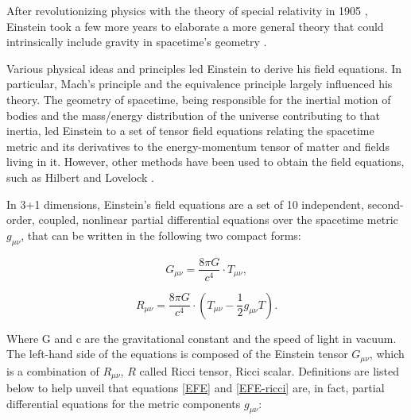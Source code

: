 After revolutionizing physics with the theory of special relativity in 1905 \cite{Einstein:1905}, Einstein took a few more years to elaborate a more general theory that could intrinsically include gravity in spacetime's geometry \cite{Einstein:1915ca}.

Various physical ideas and principles led Einstein to derive his field equations. In particular, Mach's principle \cite{mach1919science, 1995mpfn.conf.....B} and the equivalence principle largely influenced his theory. The geometry of spacetime, being responsible for the inertial motion of bodies and the mass/energy distribution of the universe contributing to that inertia, led Einstein to a set of tensor field equations relating the spacetime metric and its derivatives to the energy-momentum tensor of matter and fields living in it. However, other methods have been used to obtain the field equations, such as Hilbert \cite{Hilbert:1915tx} and Lovelock \cite{Lovelock:1971yv}. 

In 3+1 dimensions, Einstein's field equations are a set of 10 independent, second-order, coupled, nonlinear partial differential equations over the spacetime metric $g_{\mu \nu}$, that can be written in the following two compact forms:

\begin{equation}\label{EFE}
G_{\mu\nu}  =  \frac{8\pi G}{c^4} \cdot T_{\mu\nu},
\end{equation}

\begin{equation}\label{EFE-ricci}
R_{\mu\nu}  =  \frac{8\pi G}{c^4} \cdot (T_{\mu\nu} - \frac{1}{2} g_{\mu\nu} T).
\end{equation}

Where G and c are the gravitational constant and the speed of light in vacuum. The left-hand side of the equations is composed of the Einstein tensor $G_{\mu\nu}$, which is a combination of $R_{\mu\nu}$, $R$ called Ricci tensor, Ricci scalar. Definitions are listed below to help unveil that equations \ref{EFE} and \ref{EFE-ricci} are, in fact, partial differential equations for the metric components $g_{\mu\nu}$:


